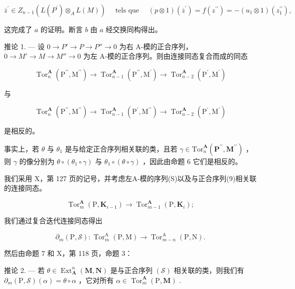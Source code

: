 \[
\overline {{{z}}} ^ {\prime} \in Z _ {n - 1} (L (P ^ {\prime}) \otimes_ {A} L (M)) \quad \text { tels   que } \quad (p \otimes 1) (\overline {{{z}}} ^ {\prime}) = f (z ^ {\prime \prime}) = - (u _ {1} \otimes 1) (z _ {1} ^ {\prime \prime}),
\]

这完成了 \(a\) 的证明。断言 \(b\) 由 \(a\) 经交换同构得出。

推论 1. --- 设 \(0 \to P' \to P \to P'' \to 0\) 为右 A-模的正合序列， \(0 \to M' \to M \to M'' \to 0\) 为左 A-模的正合序列。则由连接同态复合而成的同态

\[
\operatorname{Tor} _ {n} ^ {\mathbf {A}} \left(\mathrm{P} ^ {\prime \prime}, \mathrm{M} ^ {\prime \prime}\right)\rightarrow \operatorname{Tor} _ {n - 1} ^ {\mathbf {A}} \left(\mathrm{P} ^ {\prime \prime}, \mathrm{M} ^ {\prime}\right)\rightarrow \operatorname{Tor} _ {n - 2} ^ {\mathbf {A}} \left(\mathrm{P} ^ {\prime}, \mathrm{M} ^ {\prime}\right)
\]

与

\[
\operatorname{Tor} _ {n} ^ {\mathbf {A}} \left(\mathrm{P} ^ {\prime \prime}, \mathrm{M} ^ {\prime \prime}\right)\rightarrow \operatorname{Tor} _ {n - 1} ^ {\mathbf {A}} \left(\mathrm{P} ^ {\prime}, \mathrm{M} ^ {\prime \prime}\right)\rightarrow \operatorname{Tor} _ {n - 2} ^ {\mathbf {A}} \left(\mathrm{P} ^ {\prime}, \mathrm{M} ^ {\prime}\right)
\]

是相反的。

事实上，若 \(\theta\) 与 \(\theta_{1}\) 是与给定正合序列相关联的类，且若 \(\gamma\in\mathrm{Tor}_{n}^{\mathbf{A}}(\mathbf{P}^{\prime\prime},\mathbf{M}^{\prime\prime})\) ，则 \(\gamma\) 的像分别为 \(\theta\circ(\theta_{1}\circ\gamma)\) 与 \(\theta_{1}\circ(\theta\circ\gamma)\) ，因此由命题 6 它们是相反的。

我们采用 X，第 127 页的记号，并考虑左A-模的序列(S)以及与正合序列(9)相关联的连接同态。

\[
\operatorname{Tor} _ {m} ^ {\mathbf {A}} \left(\mathrm{P}, \mathbf {K} _ {i - 1}\right)\rightarrow \operatorname{Tor} _ {m - 1} ^ {\mathbf {A}} \left(\mathrm{P}, \mathbf {K} _ {i}\right);
\]

我们通过复合迭代连接同态得出

\[
\partial_ {m} (\mathrm{P}, \mathscr {S}): \operatorname{Tor} _ {m} ^ {\mathrm{A}} (\mathrm{P}, \mathrm{M}) \rightarrow \operatorname{Tor} _ {m - n} ^ {\mathrm{A}} (\mathrm{P}, \mathrm{N}).
\]

然后由命题 7 和 X，第 118 页，命题 3：

推论 2. --- 若 \(\theta \in \operatorname{Ext}_{\mathbf{A}}^{n}(\mathbf{M}, \mathbf{N})\) 是与正合序列 \((\mathcal{S})\) 相关联的类，则我们有 \(\partial_{m}(\mathrm{P}, \mathcal{S})(\alpha) = \theta \circ \alpha\) ，它对所有 \(\alpha \in \operatorname{Tor}_{m}^{\mathbf{A}}(\mathrm{P}, \mathbf{M})\) .

